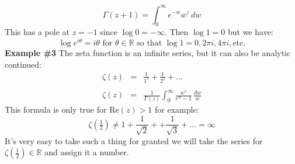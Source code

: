 \documentclass[12pt]{article}
\begin{document}
$$ \Gamma(z+1) = \int_0^\infty e^{-w} w^z \, dw  $$
This has a pole at $z = -1$ since $\log 0 = -\infty$.  Then $\log 1 = 0$ but we have:
$$ \log e^{i\theta} = i\theta \text{ for }\theta \in \mathbb{R} \text{ so that } \log 1 = 0, 2\pi i, 4\pi i, \text{etc.}$$
\textbf{Example \#3} The zeta function is an infinite series, but it can also be analytic continued:
\begin{eqnarray*}
\zeta(z) &=& \frac{1}{1^z} + \frac{1}{2^z} + \dots \\ \\
\zeta(z) &=& \frac{1}{\Gamma(z)} \int_0^\infty \frac{w^z}{e^w - 1} \, \frac{dw}{w}
\end{eqnarray*}
This formula is only true for $\mathrm{Re}(z) > 1$ for example:
$$ \zeta(\tfrac{1}{2}) \neq 1 + \frac{1}{\sqrt{2}} + 
+ \frac{1}{\sqrt{3}} + \dots  = \infty $$
It's very easy to take such a thing for granted we will take the series for $\zeta(\frac{1}{2}) \in \mathbb{R}$ and assign it a number.

\newpage 
\end{document}
